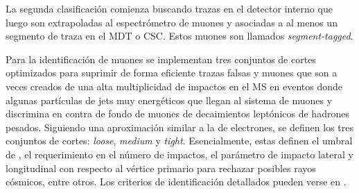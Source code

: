 La segunda clasificación comienza buscando trazas en el detector interno que
luego son extrapoladas al espectrómetro de muones y asociadas a al menos un
segmento de traza en el MDT o CSC. Estos muones son llamados
\emph{segment-tagged}.

Para la identificación de muones se implementan tres conjuntos de cortes
optimizados para suprimir de forma eficiente trazas falsas y muones que son a
veces creados de una alta multiplicidad de impactos en el MS en eventos donde
algunas partículas de jets muy energéticos que llegan al sistema de muones y
discrimina en contra de fondo de muones de decaimientos leptónicos de hadrones
pesados. Siguiendo una aproximación similar a la de electrones, se
definen los tres conjuntos de cortes: \emph{loose}, \emph{medium} y \emph{tight}.
Esencialmente, estas definen el umbral de {\pt}, el requerimiento en el número
de impactos, el parámetro de impacto lateral y longitudinal con respecto al
vértice primario para rechazar posibles rayos cósmicos, entre otros. Los
criterios de identificación detallados pueden verse en \cite{MuonEff}.


